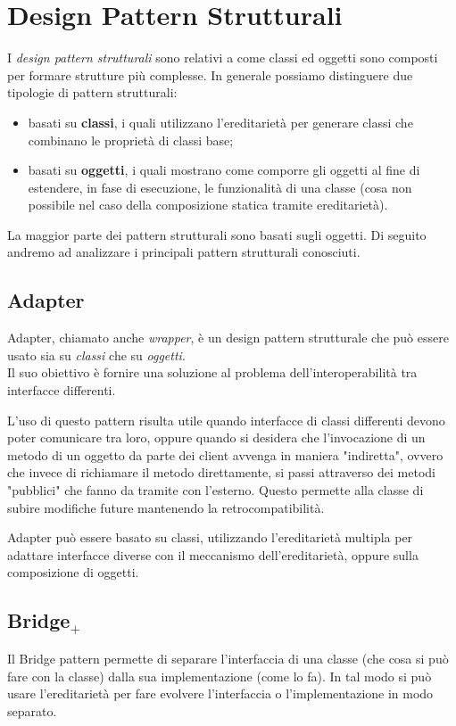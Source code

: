 \section{Design Pattern Strutturali}
I \textit{design pattern strutturali} sono relativi a come classi ed oggetti sono composti per formare strutture più complesse. 
In generale possiamo distinguere due tipologie di pattern strutturali:
\begin{itemize}
\item basati su \textbf{classi}, i quali utilizzano l'ereditarietà per generare classi che combinano le proprietà di classi base;
\item basati su \textbf{oggetti}, i quali mostrano come comporre gli oggetti al fine di estendere, in fase di esecuzione, le funzionalità di una classe (cosa non possibile nel caso della composizione statica tramite ereditarietà).
\end{itemize}
La maggior parte dei pattern strutturali sono basati sugli oggetti.
Di seguito andremo ad analizzare i principali pattern strutturali conosciuti.

\subsection{Adapter}
Adapter, chiamato anche \textit{wrapper}, è un design pattern strutturale che può essere usato sia su \textit{classi} che su \textit{oggetti}.\\
Il suo obiettivo è fornire una soluzione al problema dell'interoperabilità tra interfacce differenti.

L'uso di questo pattern risulta utile quando interfacce di classi differenti devono poter comunicare tra loro, oppure quando si desidera che l'invocazione di un metodo di un oggetto da parte dei client avvenga in maniera "indiretta", ovvero che invece di richiamare il metodo direttamente, si passi attraverso dei metodi "pubblici" che fanno da tramite con l'esterno. Questo permette alla classe di subire modifiche future mantenendo la retrocompatibilità.

Adapter può essere basato su classi, utilizzando l'ereditarietà multipla per adattare interfacce diverse con il meccanismo dell'ereditarietà, oppure sulla composizione di oggetti.

\subsection{Bridge$_+$}
Il Bridge pattern permette di separare l'interfaccia di una classe (che cosa si può fare con la classe) dalla sua implementazione (come lo fa). 
In tal modo si può usare l'ereditarietà per fare evolvere l'interfaccia o l'implementazione in modo separato.

